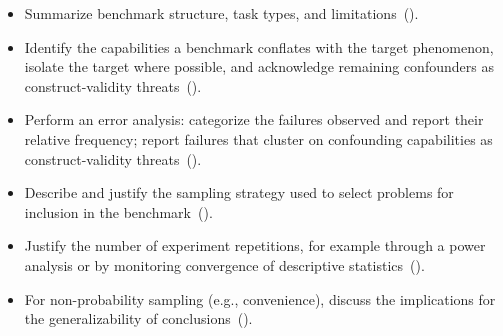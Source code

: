 \begin{itemize}[label={},leftmargin=*]
    \item \iconS Summarize benchmark structure, task types, and limitations~().
    \item \iconS Identify the capabilities a benchmark conflates with the target phenomenon, isolate the target where possible, and acknowledge remaining confounders as construct-validity threats~().
    \item \iconS Perform an error analysis: categorize the failures observed and report their relative frequency; report failures that cluster on confounding capabilities as construct-validity threats~().
    \item \iconS Describe and justify the sampling strategy used to select problems for inclusion in the benchmark~().
    \item \iconS Justify the number of experiment repetitions, for example through a power analysis or by monitoring convergence of descriptive statistics~().
    \item \iconS {} For non-probability sampling (e.g., convenience), discuss the implications for the generalizability of conclusions~().

\end{itemize}
